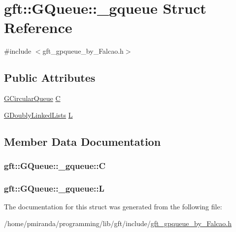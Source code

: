 \hypertarget{structgft_1_1GQueue_1_1__gqueue}{}\section{gft\+:\+:G\+Queue\+:\+:\+\_\+gqueue Struct Reference}
\label{structgft_1_1GQueue_1_1__gqueue}


{\ttfamily \#include $<$gft\+\_\+gpqueue\+\_\+by\+\_\+\+Falcao.\+h$>$}

\subsection*{Public Attributes}
\begin{DoxyCompactItemize}
\item 
\hyperlink{namespacegft_1_1GQueue_a4e50e86d194a07f26216a096b1f5a067}{G\+Circular\+Queue} \hyperlink{structgft_1_1GQueue_1_1__gqueue_abdb5cf7556a6191b3ff9402a7878e4d4}{C}
\item 
\hyperlink{namespacegft_1_1GQueue_a0e26f1e55446a32e3d979146492805e3}{G\+Doubly\+Linked\+Lists} \hyperlink{structgft_1_1GQueue_1_1__gqueue_a36d476fccc573636194a2aa9451d6a4c}{L}
\end{DoxyCompactItemize}


\subsection{Member Data Documentation}
\subsubsection[{\texorpdfstring{C}{C}}]{ gft\+::\+G\+Queue\+::\+\_\+gqueue\+::C}\hypertarget{structgft_1_1GQueue_1_1__gqueue_abdb5cf7556a6191b3ff9402a7878e4d4}{}\label{structgft_1_1GQueue_1_1__gqueue_abdb5cf7556a6191b3ff9402a7878e4d4}
\subsubsection[{\texorpdfstring{L}{L}}]{ gft\+::\+G\+Queue\+::\+\_\+gqueue\+::L}\hypertarget{structgft_1_1GQueue_1_1__gqueue_a36d476fccc573636194a2aa9451d6a4c}{}\label{structgft_1_1GQueue_1_1__gqueue_a36d476fccc573636194a2aa9451d6a4c}


The documentation for this struct was generated from the following file\+:\begin{DoxyCompactItemize}
\item 
/home/pmiranda/programming/lib/gft/include/\hyperlink{gft__gpqueue__by__Falcao_8h}{gft\+\_\+gpqueue\+\_\+by\+\_\+\+Falcao.\+h}\end{DoxyCompactItemize}
